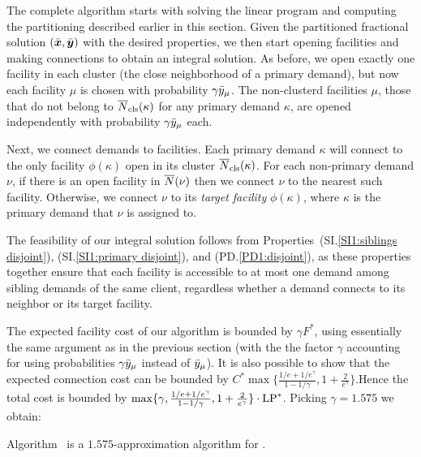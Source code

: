 \documentclass{llncs}
\begin{document}
The complete algorithm starts with solving the linear program and
computing the partitioning described earlier in this section.
Given the partitioned fractional solution $(\bar{\boldsymbol{x}},
\bar{\boldsymbol{y}})$ with the desired properties, we then start opening
facilities and making connections to obtain an integral
solution. As before, we open exactly one facility in each
cluster (the close neighborhood of a primary demand), but
now each facility $\mu$ is chosen with probability
$\gamma{\bar y}_{\mu}$. The non-clusterd facilities $\mu$,
those that do not belong to ${\overline{N}}_{\text{cls}}(\kappa)$ for any
primary demand $\kappa$, are opened independently with
probability $\gamma{\bar y}_{\mu}$ each. 

Next, we connect demands to facilities.  Each primary demand $\kappa$
will connect to the only facility $\phi(\kappa)$ open in its cluster
${\overline{N}}_{\text{cls}}(\kappa)$.  For each non-primary demand $\nu$, if there is
an open facility in ${\overline{N}}(\nu)$ then we connect $\nu$ to the nearest
such facility. Otherwise, we connect $\nu$ to its \emph{target
  facility} $\phi(\kappa)$, where $\kappa$ is the primary demand that
$\nu$ is assigned to.


The feasibility of our integral solution follows from
Properties~(SI.\ref{SI1:siblings disjoint}), (SI.\ref{SI1:primary
  disjoint}), and (PD.\ref{PD1:disjoint}), as these properties together
ensure that each facility is accessible to at most one demand among
sibling demands of the same client, regardless whether a demand
connects to its neighbor or its target facility.

The expected facility cost of our algorithm is bounded by $\gamma
F^\ast$, using essentially the same argument as in the previous
section (with the the factor $\gamma$ accounting for using
probabilities $\gamma {\bar y}_{\mu}$ instead of ${\bar y}_{\mu}$).  It is
also possible to show that the expected connection cost can be bounded
by $C^\ast \max\{\frac{1/e+1/e^\gamma}{1-1/\gamma},
1+\frac{2}{e^\gamma}\}$.Hence the total cost is bounded by
$\max\{\gamma, \frac{1/e+1/e^\gamma}{1-1/\gamma},
1+\frac{2}{e^\gamma}\}\cdot \mbox{\rm LP}^\ast$. Picking $\gamma=1.575$ we
obtain:

\begin{theorem}\label{thm:ebgs}
  Algorithm~{\EBGS} is a $1.575$-approximation algorithm for \FTFP.
\end{theorem}





\end{document}
